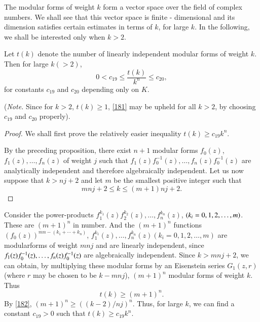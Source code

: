 The modular forms of weight $k$ form a vector space over the field of
complex numbers. We shall see that this vector space is
finite - dimensional and its dimension satisfies certain estimates in
terms of $k$, for large $k$. In the following, we shall be interested
only when $k>2$.

\begin{thm}\label{thm18}
Let $t(k)$ denote the number of linearly independent modular forms of
weight $k$. Then for large $k(>2)$,
\begin{equation*}
0<c_{19}\leq \dfrac{t(k)}{k^{n}}\leq c_{20},\tag{181}\label{181}
\end{equation*}
for constants $c_{19}$ and $c_{20}$ depending only on $K$.
\end{thm}

({\em Note.} Since for $k>2$, $t(k)\geq 1$, \eqref{181} may be upheld
for all $k>2$, by choosing $c_{19}$ and $c_{20}$ properly).

\begin{proof}
We shall first prove the relatively easier inequality $t(k)\geq
c_{19}k^{n}$.

By the preceding proposition, there exist $n+1$ modular forms
$f_{0}(z)$, $f_{1}(z),\ldots,f_{n}(z)$ of weight $j$ such that
$f_{1}(z)f^{-1}_{0}(z),\ldots,f_{n}(z)f^{-1}_{0}(z)$ are analytically
independent and therefore algebraically independent. Let us now
suppose that $k>nj+2$ and let $m$ be the smallest positive integer
such that
\begin{equation*}
mnj+2\leq k\leq (m+1)nj+2.\tag{182}\label{182}
\end{equation*}\pageoriginale
\end{proof}

Consider the power-products
$f^{k_{1}}_{1}(z)f^{k_{2}}_{2}(z),\ldots,f^{k_{n}}_{n}(z)$,
$(k_{i}=0,1,2,\break\ldots,m)$. These are $(m+1)^{n}$ in number. And the
$(m+1)^{n}$ functions $(f_{0}(z))^{mn-(k_{1}+\cdots+k_{n})}$,
$f^{k_{1}}_{1}(z),\ldots,f^{k_{n}}_{n}(z)(k_{i}=0,1,2,\ldots,m)$ are
modular\break forms of weight $mnj$ and are linearly independent, since
$f_{1}(z)f^{-1}_{0}(z),\break\ldots,f_{n}(z)f^{-1}_{0}(z)$ are algebraically
independent. Since $k>mnj+2$, we can obtain, by multiplying these
modular forms by an Eisenstein series $G_{1}(z,r)$ (where $r$ may be
chosen to be $k-mnj$), $(m+1)^{n}$ modular forms of weight $k$. Thus
$$
t(k)\geq (m+1)^{n}.
$$
By \eqref{182}, $(m+1)^{n}\geq ((k-2)/nj)^{n}$. Thus, for large $k$,
we can find a constant $c_{19}>0$ such that $t(k)\geq c_{19}k^{n}$.

